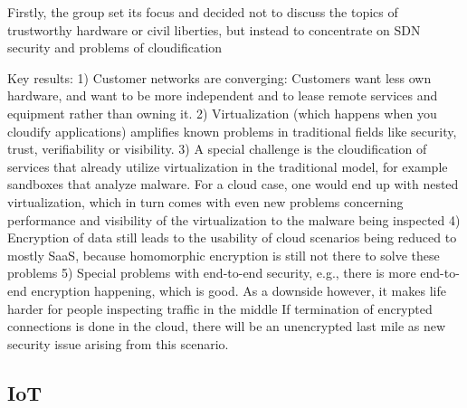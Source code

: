 Firstly, the group set its focus and decided not to discuss the topics of
trustworthy hardware or civil liberties, but instead to concentrate on SDN
security and problems of cloudification

Key results: 1) Customer networks are converging:  Customers want less own
hardware, and want to be more independent and to lease remote services and
equipment rather than owning it.  2) Virtualization (which happens when you
cloudify applications) amplifies known problems in traditional fields like
security, trust, verifiability or visibility.  3) A special challenge is the
cloudification of services that already utilize virtualization in the
traditional model, for example sandboxes that analyze malware.  For a cloud
case, one would end up with nested virtualization, which in turn comes with
even new problems concerning performance and visibility of the virtualization
to the malware being inspected 4) Encryption of data still leads to the
usability of cloud scenarios being reduced to mostly SaaS, because homomorphic
encryption is still not there to solve these problems 5) Special problems with
end-to-end security, e.g., there is more end-to-end encryption happening,
which is good.  As a downside however, it makes life harder for people
inspecting traffic in the middle If termination of encrypted connections is
done in the cloud, there will be an unencrypted last mile as new security
issue arising from this scenario.

\subsection{IoT}
